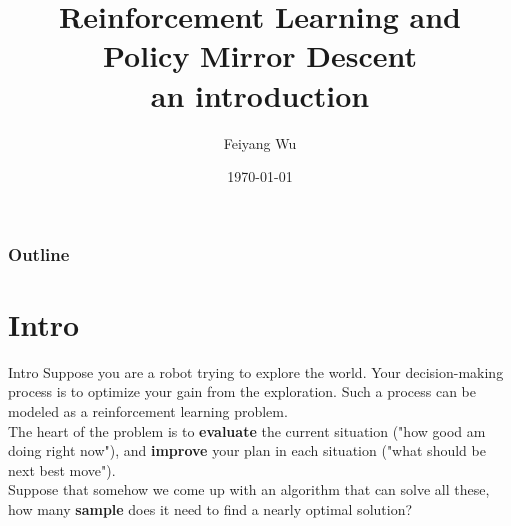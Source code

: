 \documentclass[handout]{beamer}
\title[PMD]{%
    Reinforcement Learning and \\Policy Mirror Descent\\ an introduction
    \vspace{0.5cm}
}
\author{Feiyang Wu}
\institute{
        \textit{College of Computing, School of Computer Science}\\
        \textit{Georgia Institute of Technology}
        \vspace{0.5cm}
}
\date[\today]{
    \today
}
\begin{document}
{
    \maketitle
}

\begin{frame}
\frametitle{Outline}
\tableofcontents
\end{frame}

\section{Intro}
\begin{frame}{Intro}
    \small
    Suppose you are a robot trying to explore the world. Your decision-making process is to optimize your gain from the exploration. Such a process can be modeled as a reinforcement learning problem. \\ \vspace{0.5cm}
    The heart of the problem is to \textbf{evaluate} the current situation ("how good am doing right now"), and \textbf{improve} your plan in each situation ("what should be next best move").\\ \vspace{0.5cm}
    Suppose that somehow we come up with an algorithm that can solve all these, how many \textbf{sample} does it need to find a nearly optimal solution?
\end{frame}
\end{document}
